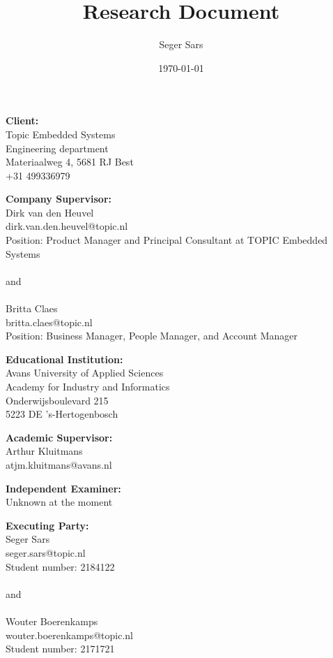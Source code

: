 \documentclass{article}
\title{Research Document}
\author{Seger Sars}
\date{\today}
\begin{document}
\maketitle

\newpage

\noindent \textbf{Client:}\\
Topic Embedded Systems\\
Engineering department\\
Materiaalweg 4, 5681 RJ Best\\
+31 499336979\\

\vspace{1em}

\noindent \textbf{Company Supervisor:}\\
Dirk van den Heuvel\\
dirk.van.den.heuvel@topic.nl\\
Position: Product Manager and Principal Consultant at TOPIC Embedded Systems\\
\\
and\\
\\
Britta Claes\\
britta.claes@topic.nl\\
Position: Business Manager, People Manager, and Account Manager

\vspace{1em}

\noindent \textbf{Educational Institution:}\\
Avans University of Applied Sciences\\
Academy for Industry and Informatics\\
Onderwijsboulevard 215\\
5223 DE 's-Hertogenbosch

\vspace{1em}

\noindent \textbf{Academic Supervisor:}\\
Arthur Kluitmans\\
atjm.kluitmans@avans.nl

\vspace{1em}

\noindent \textbf{Independent Examiner:}\\
Unknown at the moment

\vspace{1em}

\noindent \textbf{Executing Party:}\\
Seger Sars\\
seger.sars@topic.nl\\
Student number: 2184122\\
\\
and\\
\\
Wouter Boerenkamps\\
wouter.boerenkamps@topic.nl\\
Student number: 2171721
\end{document}
